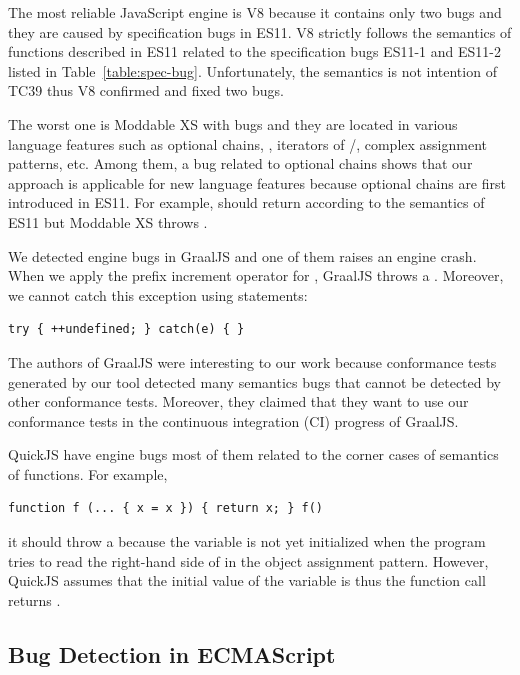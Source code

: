 The most reliable JavaScript engine is V8 because it contains only two bugs and
they are caused by specification bugs in ES11.  V8 strictly follows the
semantics of functions described in ES11 related to the specification bugs
ES11-1 and ES11-2 listed in Table~\ref{table:spec-bug}.  Unfortunately, the
semantics is not intention of TC39 thus V8 confirmed and fixed two bugs.

The worst one is Moddable XS with \inred{-} bugs and they are located in various
language features such as optional chains, ,
iterators of /, complex assignment patterns, etc.  Among
them, a bug related to optional chains shows that our approach is applicable for
new language features because optional chains are first introduced in ES11.
For example,  should return  according to
the semantics of ES11 but Moddable XS throws .

We detected \inred{-} engine bugs in GraalJS and one of them raises an engine
crash.  When we apply the prefix increment operator for ,
GraalJS throws a .  Moreover, we cannot
catch this exception using  statements:
\begin{lstlisting}[style=myJSstyle]
try { ++undefined; } catch(e) { }
\end{lstlisting}
The authors of GraalJS were interesting to our work because conformance tests
generated by our tool detected many semantics bugs that cannot be detected by
other conformance tests.  Moreover, they claimed that they want to use our
conformance tests in the continuous integration (CI) progress of GraalJS.

QuickJS have \inred{-} engine bugs most of them related to the corner cases of
semantics of functions.  For example,
\begin{lstlisting}[style=myJSstyle]
function f (... { x = x }) { return x; } f()
\end{lstlisting}
it should throw a  because the variable  is not yet
initialized when the program tries to read the right-hand side of 
in the object assignment pattern.  However, QuickJS assumes that the initial
value of the variable  is  thus the function call
 returns .


\subsection{Bug Detection in ECMAScript}

